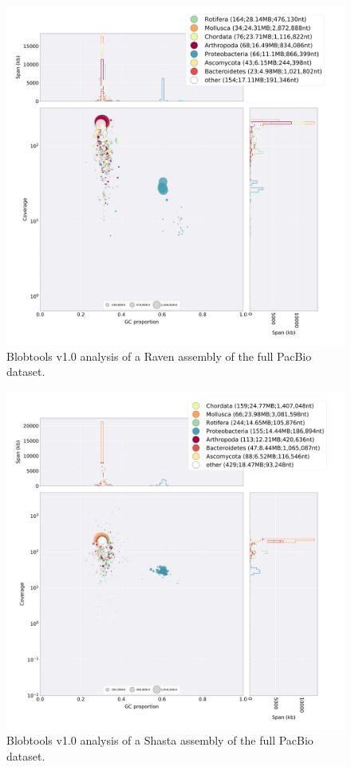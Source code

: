 \begin{suppsection}
  \begin{figure}[ht]
    \centering
     \includegraphics[width=15cm]{fig/benchmark/PB_RAVEN.png}
   \caption{Blobtools v1.0 analysis of a Raven assembly of the full PacBio dataset.}
   \label{fig:blobtools_raven_pb}
 \end{figure}
 
  \begin{figure}[ht]
    \centering
     \includegraphics[width=15cm]{fig/benchmark/PB_SHASTA.png}
   \caption{Blobtools v1.0 analysis of a Shasta assembly of the full PacBio dataset.}
   \label{fig:blobtools_shasta_pb}
 \end{figure}


\end{suppsection}
